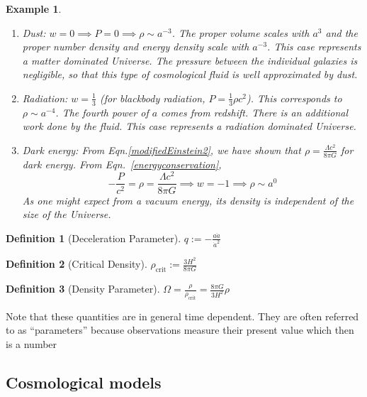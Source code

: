 \documentclass[a4paper]{article}
\newtheorem{eg}{Example}[section]
\theoremstyle{new}
\newtheorem{defi}{Definition}[section]
\begin{document}
\begin{eg}\leavevmode
\begin{enumerate}
    \item Dust: $w=0\implies P=0\implies\rho\sim a^{-3}$. The proper volume scales with $a^3$ and the proper number density and energy density scale with $a^{-3}$. This case represents a matter dominated Universe. The pressure between the individual galaxies is negligible, so that this type of cosmological fluid is well approximated by dust.
    \item Radiation: $w=\frac{1}{3}$ (for blackbody radiation, $P=\frac{1}{3}\rho c^2$). This corresponds to $\rho\sim a^{-4}$. The fourth power of $a$ comes from redshift. There is an additional work done by the fluid. This case represents a radiation dominated Universe.
    \item Dark energy: From Eqn.\ref{modifiedEinstein2}, we have shown that $\rho=\frac{\Lambda c^2}{8\pi G}$ for dark energy. From Eqn.~\ref{energyconservation}, 
    $$-\frac{P}{c^2}=\rho=\frac{\Lambda c^2}{8\pi G}\implies w=-1\implies\rho\sim a^0$$
    As one might expect from a vacuum energy, its density is independent of the size of the Universe.
\end{enumerate}
\end{eg}
\begin{defi}[Deceleration Parameter]
$q:=-\frac{a\ddot{a}}{\dot{a}^2}$
\end{defi}
\begin{defi}[Critical Density]
$\rho_{\text{crit}}:=\frac{3H^2}{8\pi G}$
\end{defi}
\begin{defi}[Density Parameter]
$\Omega=\frac{\rho}{\rho_{\text{crit}}}=\frac{8\pi G}{3H^2}\rho$
\end{defi}
Note that these quantities are in general time dependent. They are often referred to as “parameters” because observations measure their present value which then is a number
\subsection{Cosmological models}
\end{document}
